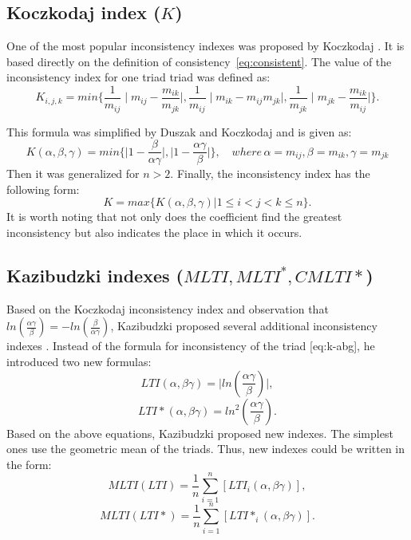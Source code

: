 \subsection{Koczkodaj index ($K$)}

One of the most popular inconsistency indexes was proposed by Koczkodaj \cite{KOCZKODAJ1993}. It is based directly on the definition of consistency~\ref{eq:consistent}. The value of the inconsistency index for one triad triad was defined as:
	\begin{equation} 
		\label{eq:K}
		K_{i,j,k}=min\{\frac{1}{m_{ij}}\mid m_{ij}-\frac{m_{ik}}{m_{jk}}\mid,\frac{1}{m_{ij}}\mid m_{ik}-m_{ij}m_{jk}\mid,\frac{1}{m_{jk}}\mid m_{jk}-\frac{m_{ik}}{m_{ij}}\mid\}.
	 \end{equation}

 This formula was simplified by Duszak and Koczkodaj \cite{DUSZAK1994} and is given as:
 	\begin{equation} 
		K(\alpha,\beta,\gamma)=min\{\mid1-\frac{\beta}{\alpha\gamma}\mid,\mid1-\frac{\alpha\gamma}{\beta}\mid\},\,\,\,\,\,\,where\,\alpha=m_{ij},\beta=m_{ik},\gamma=m_{jk}
	 \end{equation}
 Then it was generalized \cite{DUSZAK1994} for $n>2$. Finally, the inconsistency index has the following form:
 	\begin{equation} 
		K=max\{K(\alpha,\beta,\gamma)|1\leq i<j<k\leq n\}.
	 \end{equation}
 It is worth noting that not only does the coefficient find the greatest inconsistency but also indicates the place in which it occurs.


\subsection{Kazibudzki indexes ($MLTI, MLTI^{*}, CMLTI*$)}

Based on the Koczkodaj inconsistency index and observation that $ln(\frac{\alpha\gamma}{\beta})=-ln(\frac{\beta}{\alpha\gamma})$, Kazibudzki proposed several additional inconsistency indexes \cite{Kazibudzki2016}. Instead of the formula for inconsistency of the triad [eq:k-abg], he introduced two new formulas:
	\begin{equation} 
		LTI(\alpha,\beta\gamma)=\mid ln(\frac{\alpha\gamma}{\beta})\mid,
	 \end{equation}
	\begin{equation}
		\label{eq:lti*} 
		LTI*(\alpha,\beta\gamma)=ln^{2}(\frac{\alpha\gamma}{\beta}).
	 \end{equation}
Based on the above equations, Kazibudzki proposed new indexes. The simplest ones use the geometric mean of the triads. Thus, new indexes could be written in the form:
	\begin{equation} 
		MLTI(LTI)=\frac{1}{n}\sum_{i=1}^{n}\left[LTI_{i}(\alpha,\beta\gamma)\right],
	 \end{equation}
 	\begin{equation} 
		MLTI(LTI*)=\frac{1}{n}\sum_{i=1}^{n}\left[LTI*_{i}(\alpha,\beta\gamma)\right].
			 \end{equation}
 

